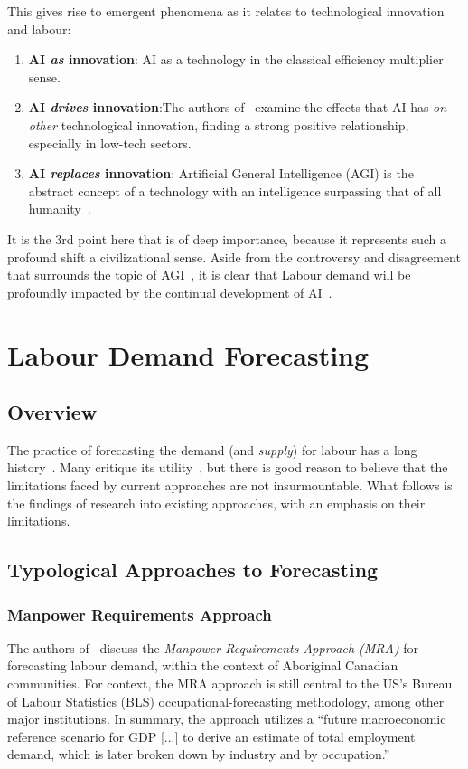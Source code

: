 This gives rise to emergent phenomena as it relates to technological innovation and labour:
\begin{enumerate}
  \item \textbf{AI \emph{as} innovation}: AI as a technology in the classical efficiency multiplier sense.
  \item \textbf{AI \emph{drives} innovation}:The authors of~\cite{liu_2020_InfluenceArtificial} examine the effects that AI has \emph{on other} technological innovation, finding a strong positive relationship, especially in low-tech sectors.
  \item \textbf{AI \emph{replaces} innovation}: Artificial General Intelligence (AGI) is the abstract concept of a technology with an intelligence surpassing that of all humanity~\textcolor{red}{\cite{TODO}}.
\end{enumerate}

It is the 3rd point here that is of deep importance, because it represents such a profound shift a civilizational sense.
Aside from the controversy and disagreement that surrounds the topic of AGI~\textcolor{red}{\cite{TODO}}, it is clear that Labour demand will be profoundly impacted by the continual development of AI~\textcolor{red}{\cite{TODO}}.


\section{Labour Demand Forecasting}
\subsection{Overview}

The practice of forecasting the demand (and \emph{supply}) for labour has a long history~\textcolor{red}{\cite{TODO}}.
Many critique its utility~\cite{thomas_2015_ReviewBest}, but there is good reason to believe that the limitations faced by current approaches are not insurmountable.
What follows is the findings of research into existing approaches, with an emphasis on their limitations.
\subsection{Typological Approaches to Forecasting}

\subsubsection{Manpower Requirements Approach~\cite{thomas_2015_ReviewBest}}
The authors of~\cite{thomas_2015_ReviewBest} discuss the \emph{Manpower Requirements Approach (MRA)} for forecasting labour demand, within the context of Aboriginal Canadian communities.
For context, the MRA approach is still central to the US's Bureau of Labour Statistics (BLS) occupational-forecasting methodology, among other major institutions.
In summary, the approach utilizes a ``future macroeconomic reference scenario for GDP [...] to derive an estimate of total employment demand, which is later broken down by industry and by occupation.''

